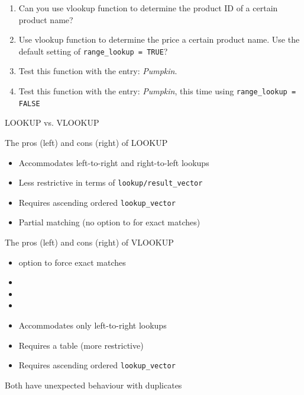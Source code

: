 \documentclass[xcolor=svgnames]{beamer}
\begin{document}
\begin{frame}
\begin{example}
\begin{enumerate}
\item Can you use vlookup function to determine the product ID of a certain product name?
\item Use vlookup function to determine the price a certain product name.  Use the default setting of {\tt range\_lookup = TRUE}? 
\item Test this function with the entry: \textit{Pumpkin}.
\item Test this function with the entry: \textit{Pumpkin}, this time using {\tt range\_lookup = FALSE} 
\end{enumerate}
\end{example}

\end{frame}



\begin{frame}[fragile]{LOOKUP vs. VLOOKUP}

The pros (left) and cons (right) of LOOKUP
\begin{multicols}{2}
    \begin{itemize}
        \item  Accommodates left-to-right and right-to-left lookups
        \item  Less restrictive in terms of {\tt lookup/result\_vector}
        \item  Requires ascending ordered {\tt lookup\_vector}
        \item  Partial matching (no option to for exact matches)
    \end{itemize}
    \end{multicols}
    
The pros (left) and cons (right)  of VLOOKUP
\begin{multicols}{2}
    \begin{itemize}
            \item  option to force exact matches
        \item[] 
        \item[] 
        \item[]
                 \item Accommodates only  left-to-right lookups
        \item Requires a table (more restrictive) 
        \item Requires ascending ordered {\tt lookup\_vector}
    \end{itemize}
    \end{multicols}
Both have unexpected behaviour with duplicates 
\end{frame}
\end{document}
